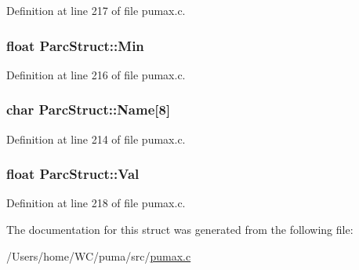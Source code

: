 \-Definition at line 217 of file pumax.\-c.

\hypertarget{struct_parc_struct_a2a2d6960e03fa37291f0fff4402f4a38}{
\subsubsection[{\-Min}]{\setlength{\rightskip}{0pt plus 5cm}float {\bf \-Parc\-Struct\-::\-Min}}}
\label{struct_parc_struct_a2a2d6960e03fa37291f0fff4402f4a38}


\-Definition at line 216 of file pumax.\-c.

\hypertarget{struct_parc_struct_ac9d04b9041919c070a322e95865dd52d}{
\subsubsection[{\-Name}]{\setlength{\rightskip}{0pt plus 5cm}char {\bf \-Parc\-Struct\-::\-Name}\mbox{[}8\mbox{]}}}
\label{struct_parc_struct_ac9d04b9041919c070a322e95865dd52d}


\-Definition at line 214 of file pumax.\-c.

\hypertarget{struct_parc_struct_a4901f0bf816a2d336307e9e3fcc95d82}{
\subsubsection[{\-Val}]{\setlength{\rightskip}{0pt plus 5cm}float {\bf \-Parc\-Struct\-::\-Val}}}
\label{struct_parc_struct_a4901f0bf816a2d336307e9e3fcc95d82}


\-Definition at line 218 of file pumax.\-c.



\-The documentation for this struct was generated from the following file\-:\begin{DoxyCompactItemize}
\item 
/\-Users/home/\-W\-C/puma/src/\hyperlink{pumax_8c}{pumax.\-c}\end{DoxyCompactItemize}
